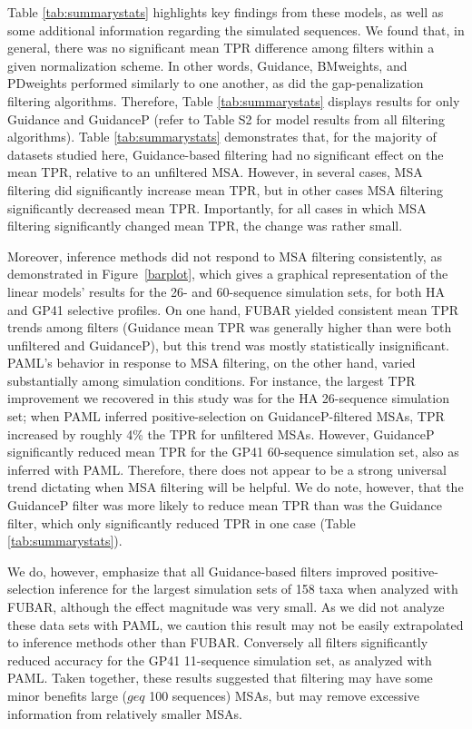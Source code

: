 \documentclass[11pt]{article}
\begin{document}
Table \ref{tab:summarystats} highlights key findings from these models, as well as some additional information regarding the simulated sequences. We found that, in general, there was no significant mean TPR difference among filters within a given normalization scheme. In other words, Guidance, BMweights, and PDweights performed similarly to one another, as did the gap-penalization filtering algorithms. Therefore, Table \ref{tab:summarystats} displays results for only Guidance and GuidanceP (refer to Table S2 for model results from all filtering algorithms). Table \ref{tab:summarystats} demonstrates that, for the majority of datasets studied here, Guidance-based filtering had no significant effect on the mean TPR, relative to an unfiltered MSA. However, in several cases, MSA filtering did significantly increase mean TPR, but in other cases MSA filtering significantly decreased mean TPR. Importantly, for all cases in which MSA filtering significantly changed mean TPR, the change was rather small. 

Moreover, inference methods did not respond to MSA filtering consistently, as demonstrated in Figure~\ref{barplot}, which gives a graphical representation of the linear models' results for the 26- and 60-sequence simulation sets, for both HA and GP41 selective profiles. On one hand, FUBAR yielded consistent mean TPR trends among filters (Guidance mean TPR was generally higher than were both unfiltered and GuidanceP), but this trend was mostly statistically insignificant. PAML's behavior in response to MSA filtering, on the other hand, varied substantially among simulation conditions. For instance, the largest TPR improvement we recovered in this study was for the HA 26-sequence simulation set; when PAML inferred positive-selection on GuidanceP-filtered MSAs, TPR increased by roughly 4\% the TPR for unfiltered MSAs. However, GuidanceP significantly reduced mean TPR for the GP41 60-sequence simulation set, also as inferred with PAML. Therefore, there does not appear to be a strong universal trend dictating when MSA filtering will be helpful. We do note, however, that the GuidanceP filter was more likely to reduce mean TPR than was the Guidance filter, which only significantly reduced TPR in one case (Table \ref{tab:summarystats}). 

We do, however, emphasize that all Guidance-based filters improved positive-selection inference for the largest simulation sets of 158 taxa when analyzed with FUBAR, although the effect magnitude was very small. As we did not analyze these data sets with PAML, we caution this result may not be easily extrapolated to inference methods other than FUBAR. Conversely all filters significantly reduced accuracy for the GP41 11-sequence simulation set, as analyzed with PAML. Taken together, these results suggested that filtering may have some minor benefits large ($geq$ 100 sequences) MSAs, but may remove excessive information from relatively smaller MSAs.
\end{document}
